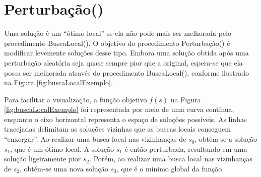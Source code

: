 \section{Perturbação()}

Uma solução é um ``ótimo local'' se ela não pode mais ser melhorada pelo procedimento BuscaLocal(). O objetivo do procedimento Perturbação() é modificar levemente soluções desse tipo. Embora uma solução obtida após uma perturbação aleatória seja quase sempre pior que a original, espera-se que ela possa ser melhorada através do procedimento BuscaLocal(), conforme ilustrado na Figura \ref{fig:buscaLocalExemplo}. 

Para facilitar a visualização, a função objetivo \(f(s)\) na Figura \ref{fig:buscaLocalExemplo} foi representada por meio de uma curva contínua, enquanto o eixo horizontal representa o espaço de soluções possíveis. As linhas tracejadas delimitam as soluções vizinhas que as buscas locais conseguem ``enxergar''. Ao realizar uma busca local nas vizinhanças de \(s_0\), obtém-se a solução \(s_1\), que é um ótimo local. A solução \(s_1\) é então perturbada, resultando em uma solução ligeiramente pior \(s_2\). Porém, ao realizar uma busca local nas vizinhanças de \(s_2\), obtém-se uma nova solução \(s_3\), que é o mínimo global da função. 


